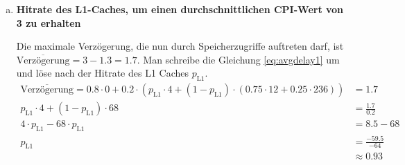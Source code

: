 \begin{enumerate}[a)]
	
	\item \textbf{Hitrate des L1-Caches, um einen durchschnittlichen CPI-Wert von 3 zu erhalten}
	
	Die maximale Verzögerung, die nun durch Speicherzugriffe auftreten darf, ist $ \overline{\text{Verzögerung}} = 3 - 1.3 = 1.7 $.
	Man schreibe die Gleichung \ref{eq:avgdelay1} um und löse nach der Hitrate des L1 Caches $ p_\text{L1} $.
	\begin{align}
	\overline{\text{Verzögerung}} = 0.8 \cdot 0 + 0.2 \cdot (p_\text{L1} \cdot 4 + (1- p_\text{L1}) \cdot(0.75 \cdot 12 + 0.25 \cdot 236)) &= 1.7 \\
	 p_\text{L1} \cdot 4 + (1- p_\text{L1}) \cdot 68 &= \frac{1.7}{0.2} \\
	  4 \cdot p_\text{L1} - 68 \cdot p_\text{L1} &= 8.5 - 68 \\
	  p_\text{L1} &= \frac{-59.5}{-64} \\
	  &\approx 0.93
	\end{align}
\end{enumerate}